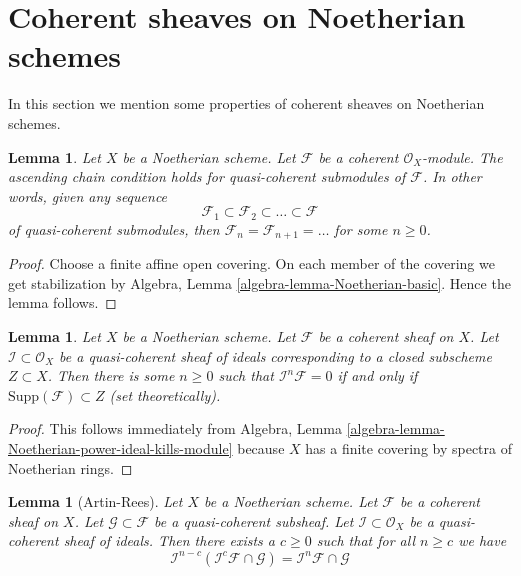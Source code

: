 \documentclass{stacks-project}
\theoremstyle{plain}
\newtheorem{lemma}[subsection]{Lemma}
\theoremstyle{definition}
\theoremstyle{remark}
\numberwithin{equation}{subsection}
\begin{document}
\section{Coherent sheaves on Noetherian schemes}
\label{section-coherent-quasi-compact}

\noindent
In this section we mention some properties of coherent sheaves on
Noetherian schemes.

\begin{lemma}
\label{lemma-acc-coherent}
Let $X$ be a Noetherian scheme.
Let $\mathcal{F}$ be a coherent $\mathcal{O}_X$-module.
The ascending chain condition holds for quasi-coherent submodules
of $\mathcal{F}$. In other words, given any sequence
$$
\mathcal{F}_1 \subset \mathcal{F}_2 \subset \ldots \subset \mathcal{F}
$$
of quasi-coherent submodules, then
$\mathcal{F}_n = \mathcal{F}_{n + 1} = \ldots $ for some $n \geq 0$.
\end{lemma}

\begin{proof}
Choose a finite affine open covering.
On each member of the covering we get stabilization by
Algebra, Lemma \ref{algebra-lemma-Noetherian-basic}.
Hence the lemma follows.
\end{proof}

\begin{lemma}
\label{lemma-power-ideal-kills-sheaf}
Let $X$ be a Noetherian scheme.
Let $\mathcal{F}$ be a coherent sheaf on $X$.
Let $\mathcal{I} \subset \mathcal{O}_X$ be a quasi-coherent
sheaf of ideals corresponding to a closed subscheme $Z \subset X$.
Then there is some $n \geq 0$ such that $\mathcal{I}^n\mathcal{F} = 0$
if and only if $\text{Supp}(\mathcal{F}) \subset Z$ (set theoretically).
\end{lemma}

\begin{proof}
This follows immediately from
Algebra, Lemma \ref{algebra-lemma-Noetherian-power-ideal-kills-module}
because $X$ has a finite covering by spectra of Noetherian rings.
\end{proof}

\begin{lemma}[Artin-Rees]
\label{lemma-Artin-Rees}
Let $X$ be a Noetherian scheme.
Let $\mathcal{F}$ be a coherent sheaf on $X$.
Let $\mathcal{G} \subset \mathcal{F}$ be a quasi-coherent subsheaf.
Let $\mathcal{I} \subset \mathcal{O}_X$ be a quasi-coherent sheaf of
ideals.
Then there exists a $c \geq 0$ such that for all $n \geq c$ we
have
$$
\mathcal{I}^{n - c}(\mathcal{I}^c\mathcal{F} \cap \mathcal{G})
=
\mathcal{I}^n\mathcal{F} \cap \mathcal{G}
$$
\end{lemma}
\end{document}
